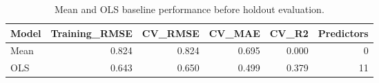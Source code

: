 \begin{table}

\caption{\label{tab:p3-baseline-performance}Mean and OLS baseline performance before holdout evaluation.}
\centering
\begin{tabular}[t]{lrrrrr}
\toprule
Model & Training\_RMSE & CV\_RMSE & CV\_MAE & CV\_R2 & Predictors\\
\midrule
Mean & 0.824 & 0.824 & 0.695 & 0.000 & 0\\
OLS & 0.643 & 0.650 & 0.499 & 0.379 & 11\\
\bottomrule
\end{tabular}
\end{table}
